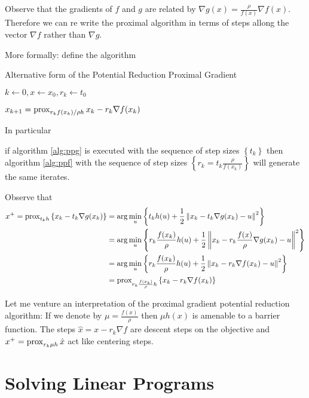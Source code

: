 \documentclass[smallextended]{article}       %
\begin{document}
Observe that the gradients of $f$ and $g$ are related by $\nabla g(x) = \frac{\rho}{f(x)}\nabla f(x)$.
Therefore we can re write the proximal algorithm in terms of steps allong the vector
$\nabla f$ rather than $\nabla g$. 

More formally: define the algorithm
\begin{algorithm}
  \caption{Alternative form of the Potential Reduction Proximal Gradient}
  \begin{algorithmic}
  \STATE $k \gets 0, x \gets x_0, r_k \gets t_0$

    \STATE $x_{k+1} = \operatorname{prox}_{r_kf(x_k)/\rho h}{x_k - r_k \nabla f(x_k)}$
  \ENDWHILE
  \end{algorithmic}
  \label{alg:ppf}
\end{algorithm}

In particular 
\begin{clm}
if algorithm \eqref{alg:ppg} is executed with the sequence of 
step sizes $\left\{ t_k \right\}$ then algorithm \eqref{alg:ppf} with 
the sequence of step sizes $\left\{ r_k = t_k \frac{\rho}{f(x_k)}\right\}$ will generate the same iterates.

\end{clm}
\begin{prf}
 Observe that 
 \begin{align*}
   x^+ = \operatorname{prox}_{t_kh}\left\{x_k - t_k \nabla g(x_k)\right\} & = \arg \min_u \left\{ t_kh(u) + \frac{1}{2}\left\| x_k - t_k \nabla g(x_k)-u \right\|^2 \right\} \\
   & = \arg \min_u \left\{ r_k\frac{f(x_k)}{\rho}h(u) + \frac{1}{2}\left\| x_k - r_k\frac{f(x)}{\rho} \nabla g(x_k)-u \right\|^2 \right\} \\
   & = \arg \min_u \left\{ r_k\frac{f(x_k)}{\rho}h(u) + \frac{1}{2}\left\| x_k - r_k\nabla f(x_k)-u \right\|^2 \right\} \\
   & = \operatorname{prox}_{r_k\frac{f(x_k)}{\rho}h}\left\{x_k - r_k\nabla f(x_k)\right\}
 \end{align*} 
 \end{prf} 

 Let me venture an interpretation of the proximal gradient potential reduction algorithm:
 If we denote by $\mu = \frac{f(x)}{\rho}$ then $\mu h(x)$ is amenable to a barrier function. 
 The steps $\hat x = x - r_k\nabla f$ are descent steps on the objective and $x^+ = \operatorname{prox}_{r_k \mu h}{\hat x}$ act
 like centering steps.

 \section{Solving Linear Programs}
\end{document}
